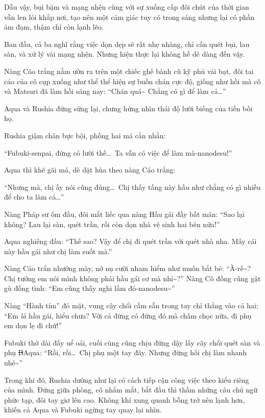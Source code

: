 \documentclass[../main.tex]{subfiles}
\begin{document}
Dẫu vậy, bụi bặm và mạng nhện cùng với sự xuống cấp đôi chút của thời gian vẫn len lỏi khắp nơi, tạo nên một cảm giác tuy có trong sáng nhưng lại có phần ảm đạm, thậm chí còn lạnh lẽo.

Ban đầu, cả ba nghĩ rằng việc dọn dẹp sẽ rất nhẹ nhàng, chỉ cần quét bụi, lau sàn, và xử lý vài mạng nhện. Nhưng hiện thực lại không hề dê dàng đến vậy.

Nàng Cáo trắng nằm ườn ra trên một chiếc ghế bành cũ kỹ phủ vải bạt, đôi tai cáo của cô cụp xuống như thể thể hiện sự buồn chán cực độ, giống như hồi mà cô và Matsuri đã làm hồi sáng nay: ``Chán quá\~{} Chẳng có gì để làm cả\dots''

Aqua và Rushia đứng sững lại, chưng hửng nhìn thái độ lười biếng của tiền bối họ.

Rushia giậm chân bực bội, phồng hai má cằn nhằn:

``Fubuki-senpai, đừng có lười thế\dots\ Ta vẫn có việc để làm mà-nanodesu!''

Aqua thì khẽ gãi má, dè dặt hùa theo nàng Cáo trắng:

``Nhưng mà, chị ấy nói cũng đúng\dots\ Chị thấy tầng này hầu như chẳng có gì nhiều để cho ta làm cả\dots''

Nàng Pháp sư ôm đầu, đôi mắt liếc qua nàng Hầu gái đầy bất mãn: ``Sao lại không? Lau lại sàn, quét trần, rồi còn dọn nhà vệ sinh hai bên nữa!''

Aqua nghiêng đầu: ``Thế sao? Vậy để chị đi quét trần với quét nhà nha. Mấy cái này hầu gái như chị làm suốt mà.''

Nàng Cáo trắn nhướng mày, nở nụ cười nham hiểm như muốn bắt bẻ: ``À-rế\~{}? Chị tưởng em nói mình không phải hầu gái cơ mà nhỉ\~{}?'' Nàng Cô đồng cũng gật gù đồng tình: ``Em cũng thấy nghi lắm đó-nanodesu\~{}''

Nàng ``Hành tím'' đỏ mặt, vung cây chổi cầm sẵn trong tay chỉ thẳng vào cả hai: ``Em \emph{là} hầu gái, hiểu chưa? Với cả đừng có đứng đó mà châm chọc nữa, đi phụ em dọn lẹ đi chứ!''

Fubuki thở dài đầy uể oải, cuối cùng cũng chịu đứng dậy lấy cây chổi quét sàn và phụ \sout{B}Aqua: ``Rồi, rồi\dots\ Chị phụ một tay đây. Nhưng đừng hối chị làm nhanh nhé\~{}''

Trong khi đó, Rushia dường như lại có cách tiếp cận công việc theo kiểu riêng của mình. Đứng giữa phòng, cô nhắm mắt, bắt đầu thì thầm những câu chú ngữ phức tạp, đôi tay giơ lên cao. Không khí xung quanh bỗng trở nên lạnh hơn, khiến cả Aqua và Fubuki ngừng tay quay lại nhìn.
\end{document}
